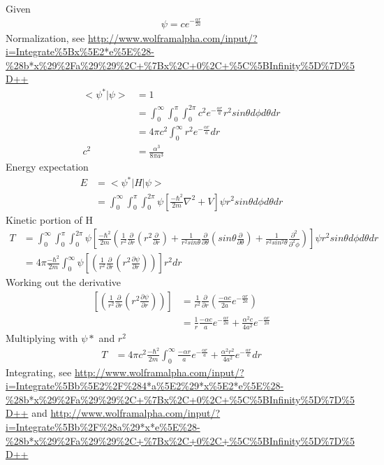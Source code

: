\documentclass{article}
\begin{document}
Given
\begin{align*}
\psi=ce^{-\frac{\alpha r}{2a}}
\end{align*}
Normalization, see \url{http://www.wolframalpha.com/input/?i=Integrate%5Bx%5E2*e%5E%28-%28b*x%29%2Fa%29%29%2C+%7Bx%2C+0%2C+%5C%5BInfinity%5D%7D%5D++}
\begin{align*}
<\psi^*|\psi>&=1\\
&=\int_0^{\infty}\int_0^{\pi}\int_0^{2\pi}c^2e^{-\frac{\alpha r}{a}}r^2 sin\theta d\phi d\theta dr\\
&=4\pi c^2 \int_0^{\infty}r^2 e^{-\frac{\alpha r}{a}} dr\\
c^2&=\frac{\alpha ^3}{8 \pi a^3}
\end{align*}
Energy expectation
\begin{align*}
E&=<\psi^*|H|\psi>\\
&=\int_0^{\infty}\int_0^{\pi}\int_0^{2\pi}\psi [\frac{-\hbar^2}{2m}\nabla^2+V] \psi r^2 sin\theta d\phi d\theta dr
\end{align*}
Kinetic portion of H
\begin{align*}
T&=\int_0^{\infty}\int_0^{\pi}\int_0^{2\pi}\psi \left[\frac{-\hbar^2}{2m}\left(\frac{1}{r^2}\frac{\partial}{\partial r}(r^2\frac{\partial}{\partial r})+\frac{1}{r^2sin \theta}\frac{\partial}{\partial \theta}(sin \theta\frac{\partial}{\partial \theta})+\frac{1}{r^2sin^2 \theta}\frac{\partial^2}{\partial ^2\phi}\right)\right] \psi r^2 sin\theta d\phi d\theta dr\\
&=4\pi \frac{-\hbar^2}{2m} \int_0^{\infty}\psi \left[\left(\frac{1}{r^2}\frac{\partial}{\partial r}(r^2\frac{\partial \psi}{\partial r}) \right)\right] r^2 dr
\end{align*}
Working out the derivative
\begin{align*}
\left[\left(\frac{1}{r^2}\frac{\partial}{\partial r}(r^2\frac{\partial \psi}{\partial r}) \right)\right]&=\frac{1}{r^2}\frac{\partial}{\partial r}\left(\frac{-\alpha c}{2a}e^{-\frac{\alpha r}{2a}}\right)\\
&=\frac{1}{r}\frac{-\alpha c}{a}e^{-\frac{\alpha r}{2a}}+\frac{\alpha^2 c}{4a^2}e^{-\frac{\alpha r}{2a}}
\end{align*}
Multiplying with $\psi*$ and $r^2$
\begin{align*}
T&=4\pi c^2 \frac{-\hbar^2}{2m}\int_0^{\infty}\frac{-\alpha r}{a}e^{-\frac{\alpha r}{a}}+\frac{\alpha^2 r^2}{4a^2}e^{-\frac{\alpha r}{a}}dr
\end{align*}
Integrating, see \url{http://www.wolframalpha.com/input/?i=Integrate%5Bb%5E2%2F%284*a%5E2%29*x%5E2*e%5E%28-%28b*x%29%2Fa%29%29%2C+%7Bx%2C+0%2C+%5C%5BInfinity%5D%7D%5D++} and \url{http://www.wolframalpha.com/input/?i=Integrate%5Bb%2F%28a%29*x*e%5E%28-%28b*x%29%2Fa%29%29%2C+%7Bx%2C+0%2C+%5C%5BInfinity%5D%7D%5D++}
\end{document}
